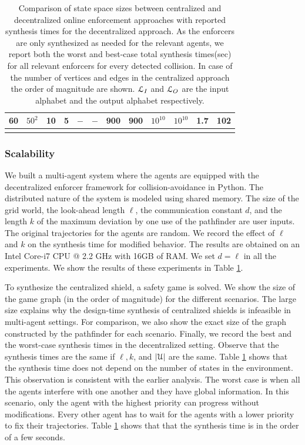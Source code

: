 \begin{table}[!t]
\begin{tabular}{cccccccccccc}
\rowcolor[rgb]{0.925,0.957,1} 60 & $50^2$  & 10        & 5       & $-$         & $-$                                                                      & 900    & 900                                                                                   & $10^{10}$    & $10^{10}$    & 1.7    & 102 \\
\bottomrule \\
\end{tabular}
\caption{Comparison of state space sizes between centralized and decentralized online enforcement approaches with reported synthesis times for the decentralized approach. As the enforcers are only synthesized as needed for the relevant agents, we report both the worst and best-case total synthesis times(sec) for all relevant enforcers for every detected collision. In case of the number of vertices and edges in the centralized approach the order of magnitude are shown. $\mathcal{L}_I$ and $\mathcal{L}_O$ are the input alphabet and the output alphabet respectively.}
\label{tab:fullresults}
\end{table}

\subsubsection{Scalability}


We built a multi-agent system where the agents are equipped with the decentralized enforcer framework for collision-avoidance in Python. The distributed nature of the system is modeled using shared memory. The size of the grid world, the look-ahead length $\ell$, the communication constant $d$, and the length $k$ of the maximum deviation by one use of the pathfinder are user inputs. The original trajectories for the agents are random. We record the effect of $\ell$ and $k$ on the synthesis time for modified behavior. 
The results are obtained on an Intel Core-i7 CPU @ 2.2 GHz with 16GB of RAM. We set $d = \ell$ in all the experiments. We show the results of these experiments in Table \ref{tab:fullresults}. 

To synthesize the centralized shield, a safety game is solved. We show the size of the game graph (in the order of magnitude) for the different scenarios.  The large size explains why the design-time synthesis of centralized shields is infeasible in multi-agent settings.
For comparison, we also show the exact size of the graph constructed by the pathfinder for each scenario. Finally, we record the best and the worst-case synthesis times in the decentralized setting. Observe that the synthesis times are the same if $\ell,k$, and $|\mathcal{U}|$ are the same. 
Table \ref{tab:fullresults} shows that the synthesis time does not depend on the number of states in the environment. This observation is consistent with the earlier analysis. The worst case is when all the agents interfere with one another and they have global information. In this scenario, only the agent with the highest priority can progress without modifications. Every other agent has to wait for the agents with a lower priority to fix their trajectories. Table \ref{tab:fullresults} shows that that the synthesis time is in the order of a few seconds. 


